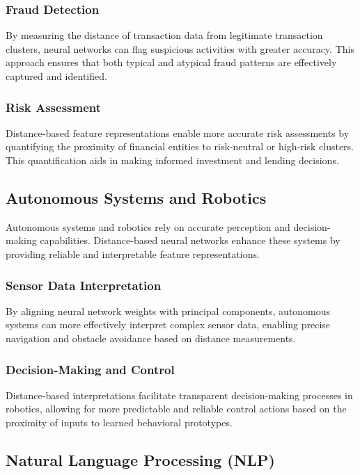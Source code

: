 \subsubsection{Fraud Detection}
By measuring the distance of transaction data from legitimate transaction clusters, neural networks can flag suspicious activities with greater accuracy. This approach ensures that both typical and atypical fraud patterns are effectively captured and identified.

\subsubsection{Risk Assessment}
Distance-based feature representations enable more accurate risk assessments by quantifying the proximity of financial entities to risk-neutral or high-risk clusters. This quantification aids in making informed investment and lending decisions.

\subsection{Autonomous Systems and Robotics}
\label{subsec:autonomous_systems}

Autonomous systems and robotics rely on accurate perception and decision-making capabilities. Distance-based neural networks enhance these systems by providing reliable and interpretable feature representations.

\subsubsection{Sensor Data Interpretation}
By aligning neural network weights with principal components, autonomous systems can more effectively interpret complex sensor data, enabling precise navigation and obstacle avoidance based on distance measurements.

\subsubsection{Decision-Making and Control}
Distance-based interpretations facilitate transparent decision-making processes in robotics, allowing for more predictable and reliable control actions based on the proximity of inputs to learned behavioral prototypes.

\subsection{Natural Language Processing (NLP)}
\label{subsec:nlp}


